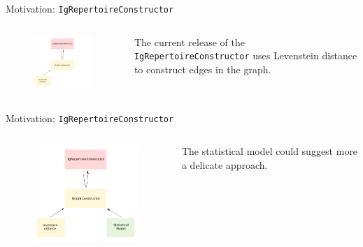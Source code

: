 \documentclass{beamer}\usepackage[]{graphicx}\usepackage[]{color}
\begin{document}
\begin{frame}{Motivation: \texttt{IgRepertoireConstructor}}
  \begin{columns}[c]
    \begin{column}{0.5\textwidth}
      \begin{figure}[h]
        \includegraphics[width=200pt]{Pictures/igRepConstr1.pdf}
      \end{figure}
    \end{column}
    \begin{column}{0.4\textwidth}
      \begin{center}
        The current release of the \texttt{IgRepertoireConstructor} uses Levenstein distance to construct edges in the graph.
      \end{center}
    \end{column}
  \end{columns}
\end{frame}

\begin{frame}{Motivation: \texttt{IgRepertoireConstructor}}
  \begin{columns}[c]
    \begin{column}{0.5\textwidth}
      \begin{figure}[h]
        \includegraphics[width=200pt]{Pictures/igRepConstr2.pdf}
      \end{figure}
    \end{column}
    \begin{column}{0.4\textwidth}
      \begin{center}
        The statistical model could suggest more a delicate approach.
      \end{center}
    \end{column}
  \end{columns}
\end{frame}
\end{document}
